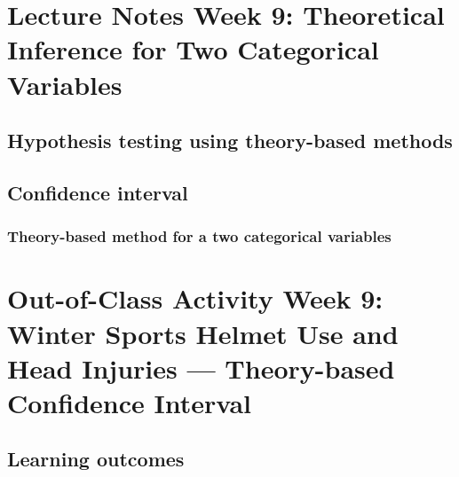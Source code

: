 \documentclass[
]{report}
\begin{document}
\hypertarget{lecture-notes-week-9-theoretical-inference-for-two-categorical-variables}{%
\section{Lecture Notes Week 9: Theoretical Inference for Two Categorical Variables}\label{lecture-notes-week-9-theoretical-inference-for-two-categorical-variables}}

\hypertarget{hypothesis-testing-using-theory-based-methods}{%
\subsection*{Hypothesis testing using theory-based methods}\label{hypothesis-testing-using-theory-based-methods}}

\hypertarget{confidence-interval-3}{%
\subsection*{Confidence interval}\label{confidence-interval-3}}

\hypertarget{theory-based-method-for-a-two-categorical-variables}{%
\subsubsection*{Theory-based method for a two categorical variables}\label{theory-based-method-for-a-two-categorical-variables}}

\hypertarget{out-of-class-activity-week-9-winter-sports-helmet-use-and-head-injuries-theory-based-confidence-interval}{%
\section{Out-of-Class Activity Week 9: Winter Sports Helmet Use and Head Injuries --- Theory-based Confidence Interval}\label{out-of-class-activity-week-9-winter-sports-helmet-use-and-head-injuries-theory-based-confidence-interval}}

\hypertarget{learning-outcomes-17}{%
\subsection{Learning outcomes}\label{learning-outcomes-17}}
\end{document}
